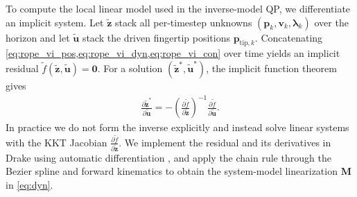 \documentclass[conference]{IEEEtran}
\begin{document}
To compute the local linear model used in the inverse-model QP, we differentiate an implicit system. Let $\tilde{\mathbf{z}}$ stack all per-timestep unknowns $(\mathbf{p}_k,\mathbf{v}_k,\boldsymbol{\lambda}_k)$ over the horizon and let $\tilde{\mathbf{u}}$ stack the driven fingertip positions $\mathbf{p}_{\mathrm{tip},k}$. Concatenating \cref{eq:rope_vi_pos,eq:rope_vi_dyn,eq:rope_vi_con} over time yields an implicit residual $\tilde f(\tilde{\mathbf{z}},\tilde{\mathbf{u}})=\mathbf{0}$. For a solution $(\tilde{\mathbf{z}}^\ast,\tilde{\mathbf{u}}^\ast)$, the implicit function theorem gives
\begin{align}
    \frac{\partial \tilde{\mathbf{z}}^\ast}{\partial \tilde{\mathbf{u}}}
    =
    -\left(\frac{\partial \tilde f}{\partial \tilde{\mathbf{z}}}\right)^{-1}
    \frac{\partial \tilde f}{\partial \tilde{\mathbf{u}}}.
    \label{eq:rope_ift}
\end{align}
In practice we do not form the inverse explicitly and instead solve linear systems with the KKT Jacobian $\frac{\partial \tilde f}{\partial \tilde{\mathbf{z}}}$. We implement the residual and its derivatives in Drake using automatic differentiation \cite{drake}, and apply the chain rule through the Bezier spline and forward kinematics to obtain the system-model linearization $\mathbf{M}$ in \cref{eq:dyn}.

\end{document}
